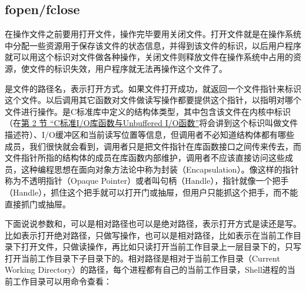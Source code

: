 \subsection{fopen/fclose}
%


在操作文件之前要用打开文件，操作完毕要用关闭文件。打开文件就是在操作系统中分配一些资源用于保存该文件的状态信息，并得到该文件的标识，以后用户程序就可以用这个标识对文件做各种操作，关闭文件则释放文件在操作系统中占用的资源，使文件的标识失效，用户程序就无法再操作这个文件了。




是文件的路径名，表示打开方式。如果文件打开成功，就返回一个文件指针来标识这个文件。以后调用其它函数对文件做读写操作都要提供这个指针，以指明对哪个文件进行操作。是C标准库中定义的结构体类型，其中包含该文件在内核中标识（在\hyperlink{db.ch28s02.id2850574}{第 2 节 “C标准I/\BookSplit{}O库函数与Unbuffered I/\BookSplit{}O函数”}将会讲到这个标识叫做文件描述符）、I/\BookSplit{}O缓冲区和当前读写位置等信息，但调用者不必知道结构体都有哪些成员，我们很快就会看到，调用者只是把文件指针在库函数接口之间传来传去，而文件指针所指的结构体的成员在库函数内部维护，调用者不应该直接访问这些成员，这种编程思想在面向对象方法论中称为封装（Encapsulation）。像这样的指针称为不透明指针（Opaque Pointer）或者叫句柄（Handle），指针就像一个把手（Handle），抓住这个把手就可以打开门或抽屉，但用户只能抓这个把手，而不能直接抓门或抽屉。



下面说说参数和，可以是相对路径也可以是绝对路径，表示打开方式是读还是写。比如表示打开绝对路径，只做写操作，也可以是相对路径，比如表示在当前工作目录下打开文件，只做读操作，再比如只读打开当前工作目录上一层目录下的，只写打开当前工作目录下子目录下的。相对路径是相对于当前工作目录（Current Working Directory）的路径，每个进程都有自己的当前工作目录，Shell进程的当前工作目录可以用命令查看：


